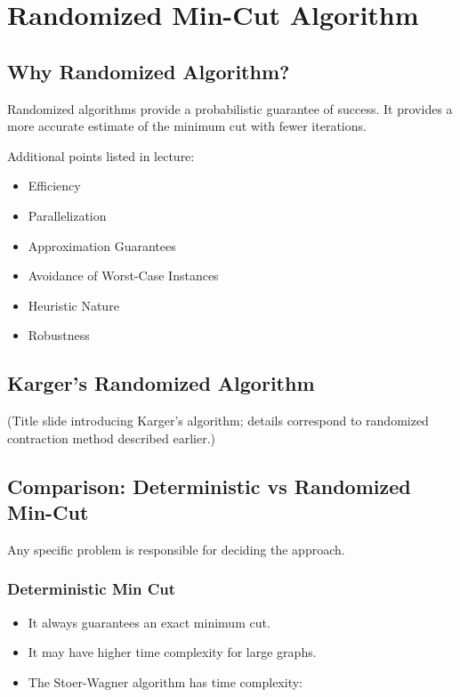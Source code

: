\documentclass[12pt]{article}
\begin{document}
\section{Randomized Min-Cut Algorithm}

\subsection{Why Randomized Algorithm?}

Randomized algorithms provide a probabilistic guarantee of success. It provides a more accurate estimate of the minimum cut with fewer iterations.

Additional points listed in lecture:

\begin{itemize}
\item Efficiency
\item Parallelization
\item Approximation Guarantees
\item Avoidance of Worst-Case Instances
\item Heuristic Nature
\item Robustness
\end{itemize}

\subsection{Karger’s Randomized Algorithm}

(Title slide introducing Karger’s algorithm; details correspond to randomized contraction method described earlier.)

\subsection{Comparison: Deterministic vs Randomized Min-Cut}

Any specific problem is responsible for deciding the approach.

\subsubsection*{Deterministic Min Cut}

\begin{itemize}
\item It always guarantees an exact minimum cut.
\item It may have higher time complexity for large graphs.
\item The Stoer-Wagner algorithm has time complexity:
\end{itemize}
\end{document}
